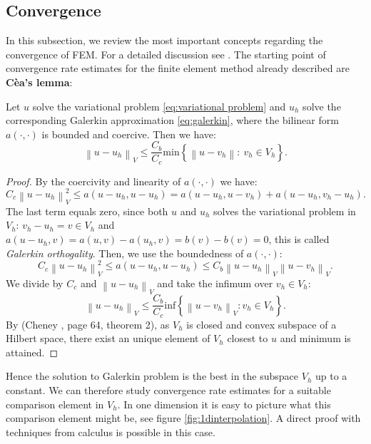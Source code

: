 \documentclass[../Main/main.tex]{subfiles}
\begin{document}
	\subsection{Convergence}\label{sec:convergence}

	
	In this subsection, we review the most important concepts regarding the convergence of FEM. For a detailed discussion see \cite{Knabner}.
	The starting point of convergence rate estimates for the finite element method already described are \textbf{Cèa's lemma}:
	\begin{theorem}\label{lemma:cea}
		Let $u$ solve the variational problem \eqref{eq:variational problem} and $u_h$ solve the corresponding Galerkin approximation \eqref{eq:galerkin}, where the bilinear form $a(\cdot,\cdot)$ is bounded and coercive. Then we have:
		\begin{equation}
			\left \| u-u_h \right \|_V \leq \frac{C_b}{C_c}\text{min} \left \{ \left \| u-v_h \right \|: \ v_h \in V_h \right \}.
		\end{equation}
		
	\end{theorem}
	\begin{proof}
		By the coercivity and linearity of $a(\cdot,\cdot)$ we have:
		\begin{equation*}
			C_c \left \| u-u_h \right \|^2_V \leq a(u-u_h,u-u_h) = a(u-u_h,u-v_h) + a(u-u_h, v_h - u_h).
		\end{equation*}
		The last term equals zero, since both $u$ and $u_h$ solves the variational problem in $V_h$: $v_h-u_h = v \in V_h$ and $a(u-u_h,v) = a(u,v)-a(u_h,v) = b(v)-b(v) = 0$, this is called \emph{Galerkin orthogality}. Then, we use the boundedness of $a(\cdot,\cdot)$:
		\begin{equation*}
			C_c \left \| u-u_h \right \|^2_V \leq a(u-u_h,u-u_h) \leq C_b \left \| u-u_h \right \|_V \left \| u-v_h \right \|_V.
		\end{equation*}
		We divide by $C_c$ and $\left \| u-u_h \right \|_V$ and take the infimum over $v_h \in V_h$:
		\begin{equation*}
			\left \| u-u_h \right \|_V \leq \frac{C_b}{C_c} \text{inf} \left \{ \left \| u-v_h \right \|_V: v_h \in V_h \right \}.
		\end{equation*}
		By (Cheney \cite{Cheney}, page 64, theorem 2), as $V_h$ is closed and convex subspace of a Hilbert space, there exist an unique element of $V_h$ closest to $u$ and minimum is attained.  
	\end{proof}
	Hence the solution to Galerkin problem is the best in the subspace $V_h$ up to a constant. We can therefore study convergence rate estimates for a suitable comparison element in $V_h$. In one dimension it is easy to picture what this comparison element might be, see figure \ref{fig:1dinterpolation}. A direct proof with techniques from calculus is possible in this case.\\
\end{document}
